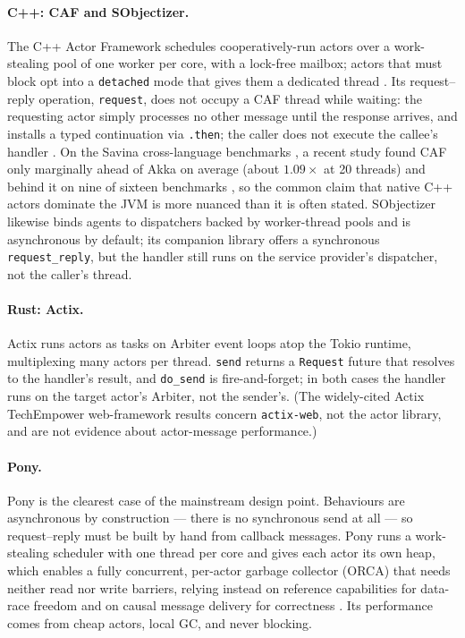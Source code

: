 \documentclass[11pt]{article}
\begin{document}
\paragraph{C++: CAF and SObjectizer.} The C++ Actor Framework schedules
cooperatively-run actors over a work-stealing pool of one worker per core, with
a lock-free mailbox; actors that must block opt into a \texttt{detached} mode
that gives them a dedicated thread \cite{caf2014}. Its request--reply operation,
\texttt{request}, does not occupy a CAF thread while waiting: the requesting
actor simply processes no other message until the response arrives, and installs
a typed continuation via \texttt{.then}; the caller does not execute the
callee's handler \cite{caf2014}. On the Savina cross-language benchmarks
\cite{imam2014savina}, a
recent study found CAF only marginally ahead of Akka on average (about
$1.09\times$ at 20 threads) and behind it on nine of sixteen benchmarks
\cite{linguafranca2023}, so the common claim that native C++ actors dominate the
JVM is more nuanced than it is often stated. SObjectizer likewise binds agents to
dispatchers backed by worker-thread pools and is asynchronous by default; its
companion library offers a synchronous \texttt{request\_reply}, but the handler
still runs on the service provider's dispatcher, not the caller's thread.

\paragraph{Rust: Actix.} Actix \cite{actix} runs actors as tasks on Arbiter event loops atop
the Tokio runtime, multiplexing many actors per thread. \texttt{send} returns a
\texttt{Request} future that resolves to the handler's result, and
\texttt{do\_send} is fire-and-forget; in both cases the handler runs on the
target actor's Arbiter, not the sender's. (The widely-cited Actix TechEmpower
web-framework results concern \texttt{actix-web}, not the actor library, and are
not evidence about actor-message performance.)

\paragraph{Pony.} Pony is the clearest case of the mainstream design point.
Behaviours are asynchronous by construction --- there is no synchronous send at
all --- so request--reply must be built by hand from callback messages. Pony
runs a work-stealing scheduler with one thread per core and gives each actor its
own heap, which enables a fully concurrent, per-actor garbage collector (ORCA)
that needs neither read nor write barriers, relying instead on reference
capabilities for data-race freedom and on causal message delivery for
correctness \cite{ponyorca2017}. Its performance comes from cheap actors,
local GC, and never blocking.
\end{document}
